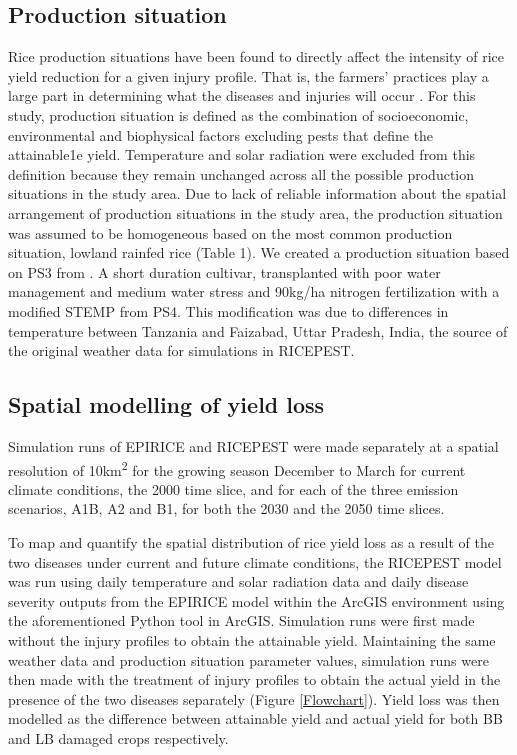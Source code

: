 \documentclass[preprint,12pt]{elsarticle}
\begin{document}
\subsection{Production situation}
Rice production situations have been found to directly affect the intensity of rice yield reduction for a given injury profile. That is, the farmers' practices play a large part in determining what the diseases and injuries will occur \cite{Savary2000}. For this study, production situation is defined as the combination of socioeconomic, environmental and biophysical factors excluding pests that define the attainable1e yield. Temperature and solar radiation were excluded from this definition because they remain unchanged across all the possible production situations in the study area. Due to lack of reliable information about the spatial arrangement of production situations in the study area, the production situation was assumed to be homogeneous based on the most common production situation, lowland rainfed rice \cite{Diagne2013} (Table 1). We created a production situation based on PS3 from \citet{Willocquet2004}. A short duration cultivar, transplanted with poor water management and medium water stress and 90kg/ha nitrogen fertilization with a modified STEMP from PS4. This modification was due to differences in temperature between Tanzania and Faizabad, Uttar Pradesh, India, the source of the original weather data for simulations in RICEPEST.

\subsection{Spatial modelling of yield loss}
Simulation runs of EPIRICE and RICEPEST were made separately at a spatial resolution of 10km\textsuperscript{2} for the growing season December to March for current climate conditions, the 2000 time slice, and for each of the three emission scenarios, A1B, A2 and B1, for both the 2030 and the 2050 time slices.

To map and quantify the spatial distribution of rice yield loss as a result of the two diseases under current and future climate conditions, the RICEPEST model was run using daily temperature and solar radiation data and daily disease severity outputs from the EPIRICE model within the ArcGIS environment using the aforementioned Python tool in ArcGIS. Simulation runs were first made without the injury profiles to obtain the attainable yield. Maintaining the same weather data and production situation parameter values, simulation runs were then made with the treatment of injury profiles to obtain the actual yield in the presence of the two diseases separately (Figure \ref{Flowchart}). Yield loss was then modelled as the difference between attainable yield and actual yield for both BB and LB damaged crops respectively.
\end{document}
